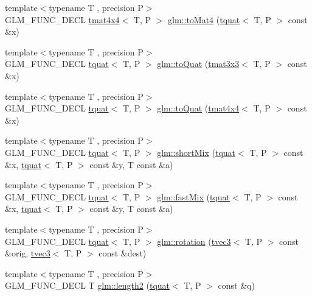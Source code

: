 \begin{DoxyCompactItemize}
\item 
{\footnotesize template$<$typename T , precision P$>$ }\\G\+L\+M\+\_\+\+F\+U\+N\+C\+\_\+\+D\+E\+CL \hyperlink{structglm_1_1tmat4x4}{tmat4x4}$<$ T, P $>$ \hyperlink{group__gtx__quaternion_gaedc9fba6485eade37cc26c16df9d7aad}{glm\+::to\+Mat4} (\hyperlink{structglm_1_1tquat}{tquat}$<$ T, P $>$ const \&x)
\item 
{\footnotesize template$<$typename T , precision P$>$ }\\G\+L\+M\+\_\+\+F\+U\+N\+C\+\_\+\+D\+E\+CL \hyperlink{structglm_1_1tquat}{tquat}$<$ T, P $>$ \hyperlink{group__gtx__quaternion_gac9e3109ca60b644ce508d6b71a1697bc}{glm\+::to\+Quat} (\hyperlink{structglm_1_1tmat3x3}{tmat3x3}$<$ T, P $>$ const \&x)
\item 
{\footnotesize template$<$typename T , precision P$>$ }\\G\+L\+M\+\_\+\+F\+U\+N\+C\+\_\+\+D\+E\+CL \hyperlink{structglm_1_1tquat}{tquat}$<$ T, P $>$ \hyperlink{group__gtx__quaternion_ga808dd0f83ee8150db7e652313bde8eb2}{glm\+::to\+Quat} (\hyperlink{structglm_1_1tmat4x4}{tmat4x4}$<$ T, P $>$ const \&x)
\item 
{\footnotesize template$<$typename T , precision P$>$ }\\G\+L\+M\+\_\+\+F\+U\+N\+C\+\_\+\+D\+E\+CL \hyperlink{structglm_1_1tquat}{tquat}$<$ T, P $>$ \hyperlink{group__gtx__quaternion_ga3534443de2a1a806f386976546cddc81}{glm\+::short\+Mix} (\hyperlink{structglm_1_1tquat}{tquat}$<$ T, P $>$ const \&x, \hyperlink{structglm_1_1tquat}{tquat}$<$ T, P $>$ const \&y, T const \&a)
\item 
{\footnotesize template$<$typename T , precision P$>$ }\\G\+L\+M\+\_\+\+F\+U\+N\+C\+\_\+\+D\+E\+CL \hyperlink{structglm_1_1tquat}{tquat}$<$ T, P $>$ \hyperlink{group__gtx__quaternion_gac11bf550f17d1da14423595a27575084}{glm\+::fast\+Mix} (\hyperlink{structglm_1_1tquat}{tquat}$<$ T, P $>$ const \&x, \hyperlink{structglm_1_1tquat}{tquat}$<$ T, P $>$ const \&y, T const \&a)
\item 
{\footnotesize template$<$typename T , precision P$>$ }\\G\+L\+M\+\_\+\+F\+U\+N\+C\+\_\+\+D\+E\+CL \hyperlink{structglm_1_1tquat}{tquat}$<$ T, P $>$ \hyperlink{group__gtx__quaternion_gac4856d356c5c97cec74e9b672ea89240}{glm\+::rotation} (\hyperlink{structglm_1_1tvec3}{tvec3}$<$ T, P $>$ const \&orig, \hyperlink{structglm_1_1tvec3}{tvec3}$<$ T, P $>$ const \&dest)
\item 
{\footnotesize template$<$typename T , precision P$>$ }\\G\+L\+M\+\_\+\+F\+U\+N\+C\+\_\+\+D\+E\+CL T \hyperlink{group__gtx__quaternion_ga02b45352c7ac345cabc9e877314acda6}{glm\+::length2} (\hyperlink{structglm_1_1tquat}{tquat}$<$ T, P $>$ const \&q)
\end{DoxyCompactItemize}


